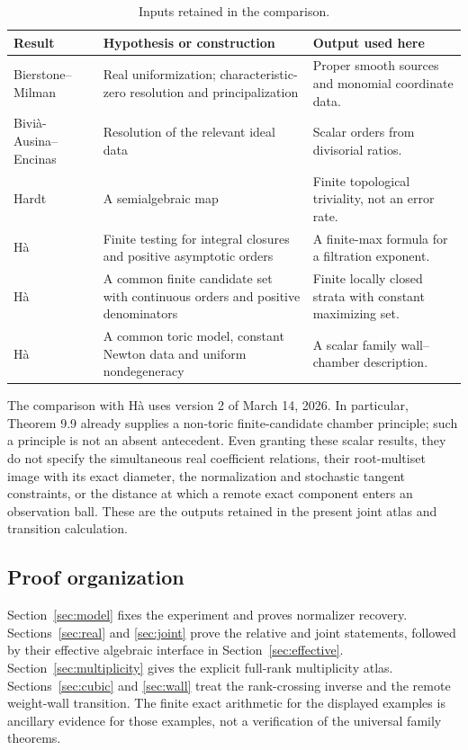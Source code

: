 \begin{table}[htbp]
\caption{Inputs retained in the comparison.}\label{tab:comparison}
\small
\begin{tabular}{@{}>{\raggedright\arraybackslash}p{}>{\raggedright\arraybackslash}p{}>{\raggedright\arraybackslash}p{}@{}}
\toprule
Result & Hypothesis or construction & Output used here\\
\midrule
Bierstone--Milman \cite{BM88,BM97,BM08}
& Real uniformization; characteristic-zero resolution and principalization
& Proper smooth sources and monomial coordinate data.\\[3pt]
Bivi\`a-Ausina--Encinas \cite{BE09}
& Resolution of the relevant ideal data
& Scalar orders from divisorial ratios.\\[3pt]
Hardt \cite{Hardt80}
& A semialgebraic map
& Finite topological triviality, not an error rate.\\[3pt]
H\`a \cite[Theorem 5.8]{Ha26}
& Finite testing for integral closures and positive asymptotic orders
& A finite-max formula for a filtration exponent.\\[3pt]
H\`a \cite[Theorem 9.9]{Ha26}
& A common finite candidate set with continuous orders and positive denominators
& Finite locally closed strata with constant maximizing set.\\[3pt]
H\`a \cite[Theorem 12.3]{Ha26}
& A common toric model, constant Newton data and uniform nondegeneracy
& A scalar family wall--chamber description.\\
\bottomrule
\end{tabular}
\end{table}

The comparison with H\`a uses version 2 of March 14, 2026. In particular,
Theorem 9.9 already supplies a non-toric finite-candidate chamber
principle; such a principle is not an absent antecedent. Even granting
these scalar results, they do not specify the simultaneous real coefficient
relations, their root-multiset image with its exact diameter, the
normalization and stochastic tangent constraints, or the distance at which
a remote exact component enters an observation ball. These are the outputs
retained in the present joint atlas and transition calculation.

\subsection*{Proof organization}
Section~\ref{sec:model} fixes the experiment and proves normalizer recovery.
Sections~\ref{sec:real} and \ref{sec:joint} prove the relative and joint
statements, followed by their effective algebraic interface in
Section~\ref{sec:effective}. Section~\ref{sec:multiplicity} gives the
explicit full-rank multiplicity atlas. Sections~\ref{sec:cubic} and
\ref{sec:wall} treat the rank-crossing inverse and the remote weight-wall
transition. The finite exact arithmetic for the displayed examples is
ancillary evidence for those examples, not a verification of the universal
family theorems.








